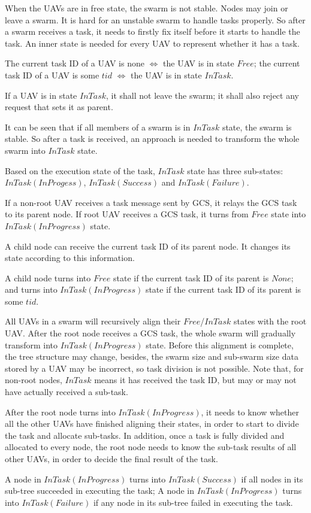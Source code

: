 When the UAVs are in free state, the swarm is not stable.
Nodes may join or leave a swarm.
It is hard for an unstable swarm to handle tasks properly.
So after a swarm receives a task,
it needs to firstly fix itself before it starts to handle the task.
An inner state is needed for every UAV to represent whether it has a task.
\begin{remark}
    The current task ID of a UAV is none $\iff$ the UAV is in state $Free$;
    the current task ID of a UAV is some $tid$ $\iff$ the UAV is in state $InTask$.
\end{remark}
\begin{remark}
    If a UAV is in state $InTask$, it shall not leave the swarm;
    it shall also reject any request that sets it as parent.
\end{remark}
It can be seen that if all members of a swarm is in $InTask$ state, the swarm is stable.
So after a task is received,
an approach is needed to transform the whole swarm into $InTask$ state.
\begin{remark}
    Based on the execution state of the task,
    $InTask$ state has three sub-states:
    $InTask(InProgess)$, $InTask(Success)$ and $InTask(Failure)$.
\end{remark}
\begin{remark}
    If a non-root UAV receives a task message sent by GCS,
    it relays the GCS task to its parent node.
    If root UAV receives a GCS task,
    it turns from $Free$ state into $InTask(InProgress)$ state.
\end{remark}
A child node can receive the current task ID of its parent node.
It changes its state according to this information.
\begin{remark}
    A child node turns into $Free$ state if the current task ID of its parent is $None$;
    and turns into $InTask(InProgress)$ state if the current task ID of its parent is some $tid$.
\end{remark}
All UAVs in a swarm will recursively align their $Free$/$InTask$ states with the root UAV.
After the root node receives a GCS task,
the whole swarm will gradually transform into $InTask(InProgress)$ state.
Before this alignment is complete,
the tree structure may change,
besides, the swarm size and sub-swarm size data stored by a UAV may be incorrect,
so task division is not possible.
Note that, for non-root nodes,
$InTask$ means it has received the task ID,
but may or may not have actually received a sub-task.

After the root node turns into $InTask(InProgress)$,
it needs to know whether all the other UAVs have finished aligning their states,
in order to start to divide the task and allocate sub-tasks.
In addition, once a task is fully divided and allocated to every node,
the root node needs to know the sub-task results of all other UAVs,
in order to decide the final result of the task.
\begin{remark}
    A node in $InTask(InProgress)$ turns into $InTask(Success)$
    if all nodes in its sub-tree succeeded in executing the task;
    A node in $InTask(InProgress)$ turns into $InTask(Failure)$
    if any node in its sub-tree failed in executing the task.
\end{remark}

